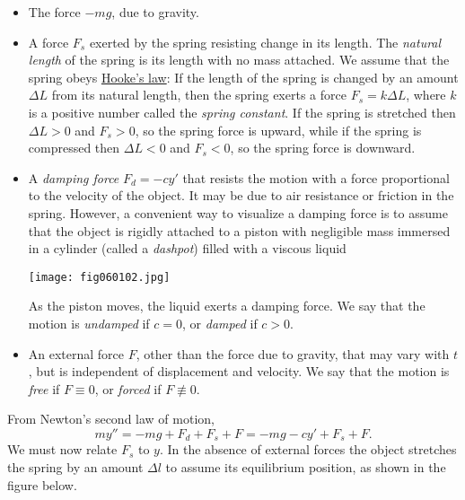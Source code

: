 \documentclass{ximera}
\begin{document}
\begin{itemize}
\item The force $-mg$, due to gravity.
 
\item A force $F_s$ exerted by the spring resisting change in its
length. The \textit{natural length} of the spring is its length with
no mass attached. We assume that the spring obeys
\href{http://www-history.mcs.st-and.ac.uk/Mathematicians/Hooke.html}
{Hooke's law}:
If the length of the spring is changed by an amount $\Delta L$
from its natural length,  then the spring exerts a force $F_s=k\Delta
L$, where $k$ is a positive number called the \textit{spring constant}.
If the spring is stretched then  $\Delta L>0$ and $F_s>0$, so the
spring force is upward, while if the spring is compressed then $\Delta
L<0$ and $F_s<0$, so the spring force is downward.
 
\item A \textit{damping force} $F_d=-cy'$ that resists the motion with
a force proportional to the velocity of the object. It may be due to
air resistance or friction in the spring. However, a convenient way to
visualize a damping force is to assume that the object is rigidly
attached to a piston with negligible mass immersed in a cylinder
(called a \textit{dashpot}) filled with a viscous liquid
 
\begin{image}
  \texttt{[image: fig060102.jpg]}
\end{image}
 
As the piston moves, the liquid exerts a
damping force. We say that the motion is \textit{undamped} if $c=0$, or
\textit{damped} if $c>0$.
 
 
\item An external force $F$, other than the force due to gravity, that
may vary with $t$, but is independent of displacement and velocity. We
say that the motion is \textit{free} if $F\equiv0$, or \textit{forced}
if $F\not\equiv0$.
 
\end{itemize}
 
 
 
From Newton's second law of motion,
\begin{equation}\label{eq:6.1.1}
my''=-mg+F_d+F_s+F=-mg-cy'+F_s+F.
\end{equation}
We must now relate $F_s$ to $y$. In the absence of external forces the
object stretches the spring by an amount $\Delta l$ to assume its
equilibrium position, as shown in the figure below.
 
\end{document}
